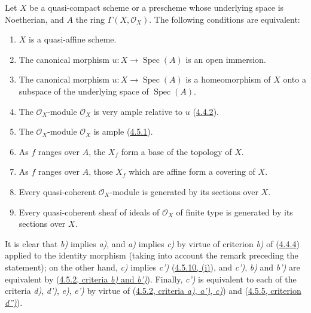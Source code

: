 \begin{proposition}[5.1.2]
\label{II.5.1.2}
Let $X$ be a quasi-compact scheme or a prescheme whose underlying space
is Noetherian, and $A$ the ring $\Gamma(X,\mathcal{O}_X)$. The following
conditions are equivalent:
\begin{enumerate}
  \item[\rm{a)}] $X$ is a quasi-affine scheme.
  \item[\rm{b)}] The canonical morphism
  $u:X\to\operatorname{Spec}(A)$ is an open immersion.
  \item[\rm{b')}] The canonical morphism
  $u:X\to\operatorname{Spec}(A)$ is a homeomorphism of $X$ onto a
  subspace of the underlying space of $\operatorname{Spec}(A)$.
  \item[\rm{c)}] The $\mathcal{O}_X$-module $\mathcal{O}_X$ is very ample
  relative to $u$ \textup{(\hyperref[II.4.4.2]{4.4.2})}.
  \item[\rm{c')}] The $\mathcal{O}_X$-module $\mathcal{O}_X$ is ample
  \textup{(\hyperref[II.4.5.1]{4.5.1})}.
  \item[\rm{d)}] As $f$ ranges over $A$, the $X_f$ form a base of the
  topology of $X$.
  \item[\rm{d')}] As $f$ ranges over $A$, those $X_f$ which are affine
  form a covering of $X$.


  \item[\rm{e)}] Every quasi-coherent $\mathcal{O}_X$-module is generated by
  its sections over $X$.
  \item[\rm{e')}] Every quasi-coherent sheaf of ideals of
  $\mathcal{O}_X$ of finite type is generated by its sections over $X$.
\end{enumerate}
\end{proposition}

It is clear that \emph{b)} implies \emph{a)}, and \emph{a)} implies \emph{c)} by virtue of criterion \emph{b)} of
(\hyperref[II.4.4.4]{4.4.4}) applied to the identity morphism (taking into
account the remark preceding the statement); on the other hand, \emph{c)} implies \emph{c')}
(\hyperref[II.4.5.10]{4.5.10, (i)}), and \emph{c')}, \emph{b)} and \emph{b')} are equivalent by
(\hyperref[II.4.5.2]{4.5.2, criteria \emph{b)} and \emph{b')}}). Finally, \emph{c')} is equivalent
to each of the criteria \emph{d)}, \emph{d')}, \emph{e)}, \emph{e')} by virtue of
(\hyperref[II.4.5.2]{4.5.2, criteria \emph{a)}, \emph{a')}, \emph{c)}}) and
(\hyperref[II.4.5.5]{4.5.5, criterion \emph{d'')}}).

